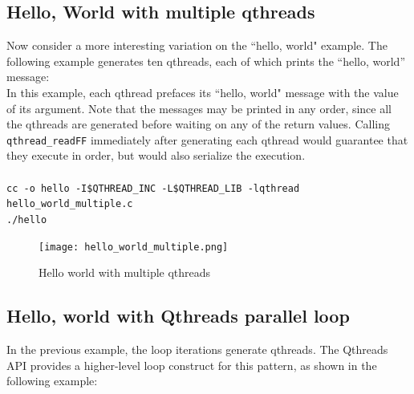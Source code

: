 \documentclass[12pt,fullpage]{article}
\begin{document}
\subsection{Hello, World with multiple qthreads}

Now consider a more interesting variation on the ``hello, world" example.  The following example generates ten qthreads, each of which prints the ``hello, world'' message:
\\


In this example, each qthread prefaces its ``hello, world" message with the value of its argument.  Note that the messages may be printed in any order, since all the qthreads are generated before waiting on any of the return values.  Calling {\tt qthread\_readFF} immediately after generating each qthread would guarantee that they execute in order, but would also serialize the execution.
\\ \\
{\footnotesize{\tt cc -o hello -I\$QTHREAD\_INC -L\$QTHREAD\_LIB -lqthread hello\_world\_multiple.c}}
\\
{\footnotesize{\tt ./hello}}
\begin{figure}[h]
\texttt{[image: hello\_world\_multiple.png]}
\caption{Hello world with multiple qthreads}
\label{fig:hello_world_multiple}
\end{figure}

\subsection{Hello, world with Qthreads parallel loop}

In the previous example, the loop iterations generate qthreads.  The Qthreads API provides a higher-level loop construct for this pattern, as shown in the following example:
\\

\end{document}
